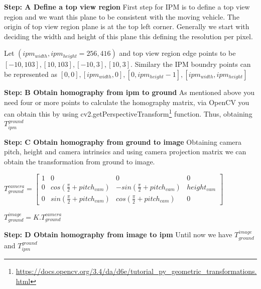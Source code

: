      \textbf{Step: A Define a top view region \newline} 
     First step for IPM is to define a top view region and we want this plane to be consistent with the moving vehicle. The origin of top view region plane is at the top left corner. Generally we start with deciding the width and height of this plane this defining the resolution per pixel. 
     
     Let $(ipm_{width}, ipm_{height} = 256, 416)$ and top view region edge points to be $[-10, 103], [10, 103], [-10, 3], [10, 3]$. Similary the IPM boundry points can be represented as $[0, 0],
                                                              [ipm_{width}, 0],
                                                              [0, ipm_{height}-1],
                                                              [ipm_{width}, ipm_{height}]$

     \textbf{Step: B Obtain homography from ipm to ground} \newline
     As mentioned above you need four or more points to calculate the homography matrix, via OpenCV you can obtain this by using cv2.getPerspectiveTransform\footnote{\url{https://docs.opencv.org/3.4/da/d6e/tutorial_py_geometric_transformations.html}} function. 
     Thus, obtaining $T^{ground}_{ipm}$
     
     \textbf{Step: C Obtain homography from ground to image} \newline
     Obtaining camera pitch, height and camera intrinsics and using camera projection matrix we can obtain the transformation from ground to image. 
     \begin{center}
     $T_{ground}^{camera } = \begin{bmatrix}1 & 0 & 0 & 0 \\0 & cos(\frac{\pi}{2} + pitch_{cam}) & -sin(\frac{\pi}{2} + pitch_{cam}) & height_{cam} \\ 0 &sin(\frac{\pi}{2} + pitch_{cam}) &cos(\frac{\pi}{2} + pitch_{cam}) & 0   \end{bmatrix}$
     \end{center}
     
     \begin{center}
     $T_{ground}^{image} = K . T_{ground}^{camera }$
    \end{center}
    
    
     \textbf{Step: D Obtain homography from image to ipm} \newline
    Until now we have $T^{image}_{ground}$ and $T^{ground}_{ipm}$
    
